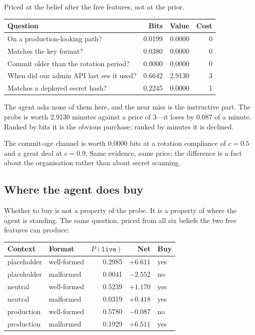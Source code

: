 \documentclass{article}
\begin{document}
Priced at the belief after the free features, not at the prior.

\begin{center}
\small
\begin{tabular}{@{}p{3.5cm}rrr@{}}
\toprule
Question & Bits & Value & Cost \\
\midrule
On a production-looking path? & 0.0199 & 0.0000 & 0 \\
Matches the key format? & 0.0380 & 0.0000 & 0 \\
Commit older than the rotation period? & 0.0000 & 0.0000 & 0 \\
When did our admin API last see it used? & 0.6642 & 2.9130 & 3 \\
Matches a deployed secret hash? & 0.2245 & 0.0000 & 1 \\
\bottomrule
\end{tabular}
\end{center}

The agent asks none of them here, and the near miss is the instructive part. The
probe is worth 2.9130 minutes against a price of 3---it loses by 0.087 of a
minute. Ranked by bits it is the obvious purchase; ranked by minutes it is
declined.

The commit-age channel is worth 0.0000 bits at a rotation compliance of $c = 0.5$
and a great deal at $c = 0.9$. Same evidence, same price; the difference is a
fact about the organisation rather than about secret scanning.

\subsection{Where the agent does buy}

Whether to buy is not a property of the probe. It is a property of where the
agent is standing. The same question, priced from all six beliefs the two free
features can produce:

\begin{center}
\small
\begin{tabular}{@{}llrrl@{}}
\toprule
Context & Format & $P(\texttt{live})$ & Net & Buy \\
\midrule
placeholder & well-formed & 0.2985 & $+6.611$ & yes \\
placeholder & malformed & 0.0041 & $-2.552$ & no \\
neutral & well-formed & 0.5239 & $+1.170$ & yes \\
neutral & malformed & 0.0319 & $+0.418$ & yes \\
production & well-formed & 0.5780 & $-0.087$ & no \\
production & malformed & 0.1929 & $+6.511$ & yes \\
\bottomrule
\end{tabular}
\end{center}
\end{document}
